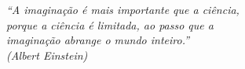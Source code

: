 \begin{epigrafe}
    \vspace*{\fill}
	\begin{flushright}
		\textit{``A imaginação é mais importante que a ciência,\\
		porque a ciência é limitada, ao passo que a\\
		imaginação abrange o mundo inteiro.''\\ 
		(Albert Einstein)}
	\end{flushright}
\end{epigrafe}
